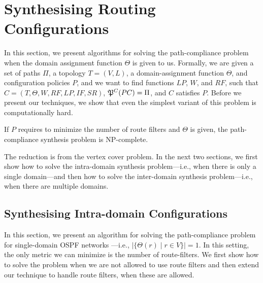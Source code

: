 \section{Synthesising Routing Configurations}
\label{sec:config-synthesis}

In this section, we present algorithms for 
solving the path-compliance problem when the domain
assignment function $\Theta$ is given to us.
Formally, we are given a set of paths $\Pi$,
a topology $T=(V,L)$,
a domain-assignment function $\Theta$, 
and configuration policies $P$,
and we want to find functions
$LP$, $W$, and $RF$,  such that
$C=(T,\Theta,W,RF,LP,IF,SR)$,
$\mathfrak{P}^C(PC) = \Pi$, and
$C$ satisfies $P$.
Before we present our techniques,
we  show that
even the simplest variant of this problem is computationally hard.
\begin{theorem}
\label{thm:ospfsynth}
If $P$ requires to minimize the number of route filters and $\Theta$ is given, the path-compliance synthesis
problem is NP-complete.
\end{theorem}
\iffull

\else
The reduction is from the vertex cover problem.
\fi
In the next two sections, we first show how to solve the intra-domain synthesis problem---i.e., when there
is only a single domain---and then how to solve the inter-domain synthesis problem---i.e., when
there are multiple domains.

\subsection{Synthesising Intra-domain Configurations} \label{sec:intra-synthesis}
In this section, we present an algorithm for 
solving the path-compliance problem for 
single-domain OSPF networks
---i.e., $|\{\Theta(r) \mid r\in V\}|=1$.
In this setting, the only metric we can minimize is the number of route-filters.
We first show how to solve the problem when
we are not allowed to use route filters
and then
extend our technique to handle route filters, when these are allowed.

